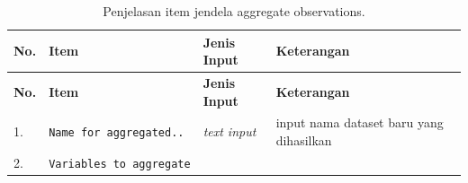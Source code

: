 \documentclass[12pt,]{krantz}
\begin{document}
\begin{longtable}[]{@{}llll@{}}
\caption{\label{tab:agregat} Penjelasan item jendela aggregate observations.}\tabularnewline
\toprule
\begin{minipage}[b]{0.04\columnwidth}\raggedright
\textbf{No.}\strut
\end{minipage} & \begin{minipage}[b]{0.15\columnwidth}\raggedright
\textbf{Item}\strut
\end{minipage} & \begin{minipage}[b]{0.09\columnwidth}\raggedright
\textbf{Jenis Input}\strut
\end{minipage} & \begin{minipage}[b]{0.60\columnwidth}\raggedright
\textbf{Keterangan}\strut
\end{minipage}\tabularnewline
\midrule
\endfirsthead
\toprule
\begin{minipage}[b]{0.04\columnwidth}\raggedright
\textbf{No.}\strut
\end{minipage} & \begin{minipage}[b]{0.15\columnwidth}\raggedright
\textbf{Item}\strut
\end{minipage} & \begin{minipage}[b]{0.09\columnwidth}\raggedright
\textbf{Jenis Input}\strut
\end{minipage} & \begin{minipage}[b]{0.60\columnwidth}\raggedright
\textbf{Keterangan}\strut
\end{minipage}\tabularnewline
\midrule
\endhead
\begin{minipage}[t]{0.04\columnwidth}\raggedright
1.\strut
\end{minipage} & \begin{minipage}[t]{0.15\columnwidth}\raggedright
\texttt{Name\ for\ aggregated..}\strut
\end{minipage} & \begin{minipage}[t]{0.09\columnwidth}\raggedright
\emph{text input}\strut
\end{minipage} & \begin{minipage}[t]{0.60\columnwidth}\raggedright
input nama dataset baru yang dihasilkan\strut
\end{minipage}\tabularnewline
\begin{minipage}[t]{0.04\columnwidth}\raggedright
2.\strut
\end{minipage} & \begin{minipage}[t]{0.15\columnwidth}\raggedright
\texttt{Variables\ to\ aggregate}\strut

\end{minipage}
\end{longtable}
\end{document}
